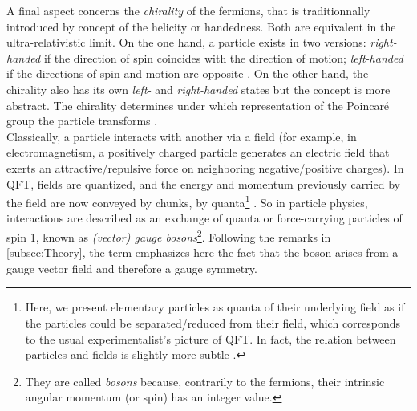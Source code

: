 A final aspect concerns the \textit{chirality} of the fermions, that is traditionnally introduced by concept of the helicity or handedness. Both are equivalent in the ultra-relativistic limit. On the one hand, a particle exists in two versions: \textit{right-handed} if the direction of spin coincides with the direction of motion; \textit{left-handed} if the directions of spin and motion are opposite \cite{thomsonModernParticlePhysics2013}. On the other hand, the chirality also has its own \textit{left-} and \textit{right-handed} states but the concept is more abstract. The chirality determines under which representation of the Poincaré group the particle transforms \cite{quantumdiariesHelicityChiralityMass2011}.\\


Classically, a particle interacts with another via a field (for example, in electromagnetism, a positively charged particle generates an electric field that exerts an attractive/repulsive force on neighboring negative/positive charges). In QFT, fields are quantized, and the energy and momentum previously carried by the field are now conveyed by chunks, by quanta\footnote{Here, we present elementary particles as quanta  of their underlying field as if the particles could be separated/reduced from their field, which corresponds to the usual experimentalist's picture of QFT. In fact, the relation between particles and fields is slightly more subtle \cite{jaegerElementaryParticlesQuantum2021}.} \cite{serwayModernPhysics2004}. So in particle physics, interactions are described as an exchange of quanta or force-carrying particles of spin 1, known as \textit{(vector) gauge bosons}\footnote{They are called \textit{bosons} because, contrarily to the fermions, their intrinsic angular momentum (or spin) has an integer value.}\cite{braibantParticlesFundamentalInteractions2012, thomsonModernParticlePhysics2013}. Following the remarks in \Sec\ref{subsec:Theory}, the term  emphasizes here the fact that the boson arises from a gauge vector field and therefore a gauge symmetry. 

